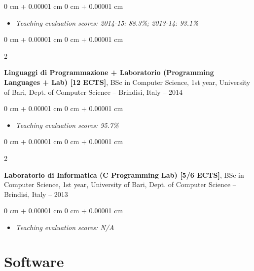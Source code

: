 \documentclass[10pt, a4paper]{article}
\newenvironment{highlights}{
    \begin{itemize}[
        topsep=0.10 cm,
        parsep=0.10 cm,
        partopsep=0pt,
        itemsep=0pt,
        leftmargin=0 cm + 10pt
    ]
}{
    \end{itemize}
} %
\newenvironment{onecolentry}{
    \begin{adjustwidth}{
        0 cm + 0.00001 cm
    }{
        0 cm + 0.00001 cm
    }
}{
    \end{adjustwidth}
} %
\newenvironment{twocolentry}[2][]{
    \onecolentry
    \def\secondColumn{#2}
    \setcolumnwidth{\fill, 4.5 cm}
    \begin{paracol}{2}
}{
    \switchcolumn \raggedleft \secondColumn
    \end{paracol}
    \endonecolentry
} %
\begin{document}
        \vspace{0.10 cm}
        \begin{onecolentry}
            \begin{highlights}
                \item \textit{Teaching evaluation scores: 2014-15: 88.3\%; 2013-14: 93.1\%}
            \end{highlights}
        \end{onecolentry}


        \vspace{0.2 cm}

        \begin{twocolentry}{
            2013 – 2014
        }
            \textbf{Linguaggi di Programmazione + Laboratorio (Programming Languages + Lab) [12 ECTS]}, BSc in Computer Science, 1st year, University of Bari, Dept. of Computer Science -- Brindisi, Italy\end{twocolentry}

        \vspace{0.10 cm}
        \begin{onecolentry}
            \begin{highlights}
                \item \textit{Teaching evaluation scores: 95.7\%}
            \end{highlights}
        \end{onecolentry}


        \vspace{0.2 cm}

        \begin{twocolentry}{
            2008 – 2013
        }
            \textbf{Laboratorio di Informatica (C Programming Lab) [5/6 ECTS]}, BSc in Computer Science, 1st year, University of Bari, Dept. of Computer Science -- Brindisi, Italy\end{twocolentry}

        \vspace{0.10 cm}
        \begin{onecolentry}
            \begin{highlights}
                \item \textit{Teaching evaluation scores: N/A}
            \end{highlights}
        \end{onecolentry}



    
    \section{Software}
\end{document}

